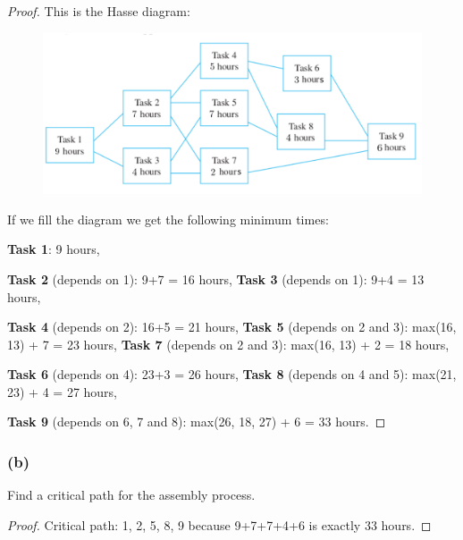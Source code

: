 \documentclass[14pt]{extarticle}
\begin{document}
\begin{proof}
This is the Hasse diagram:

\begin{figure}[ht!]
\centering
\includegraphics[scale=0.4]{../images/8.5.51.png}
\end{figure}

If we fill the diagram we get the following minimum times:

{\bf Task 1}: 9 hours, 

{\bf Task 2} (depends on 1): 9+7 = 16 hours, {\bf Task 3} (depends on 1): 9+4 = 13 hours,

{\bf Task 4} (depends on 2): 16+5 = 21 hours, {\bf Task 5} (depends on 2 and 3): max(16, 13) + 7 = 23 hours, 
{\bf Task 7} (depends on 2 and 3): max(16, 13) + 2 = 18 hours,

{\bf Task 6} (depends on 4): 23+3 = 26 hours, {\bf Task 8} (depends on 4 and 5): max(21, 23) + 4 = 27 hours,

{\bf Task 9} (depends on 6, 7 and 8): max(26, 18, 27) + 6 = 33 hours.
\end{proof}

\subsubsection{(b)}
Find a critical path for the assembly process.

\begin{proof}
Critical path: 1, 2, 5, 8, 9 because 9+7+7+4+6 is exactly 33 hours.
\end{proof}
\end{document}
